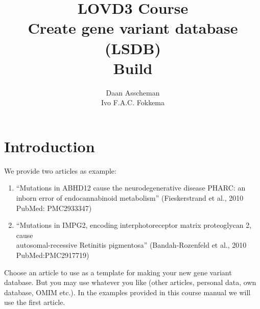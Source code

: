 

\title{LOVD3 Course \\\vskip 0.2cm Create gene variant database (LSDB) \\\vskip 0.2cm Build \LOVDversion}
\author{Daan Asscheman \\ Ivo F.A.C. Fokkema}
\setpointerwidth{9pt}





\begin{titlingpage} %
\maketitle
\end{titlingpage}





\hypertarget{toc}{}
\tableofcontents









\chapter{Introduction}
We provide two articles as example:
\begin{enumerate}
	\item 
	``Mutations in ABHD12 cause the neurodegenerative disease PHARC: an inborn error of endocannabinoid
	 metabolism'' (Fieskerstrand et al., 2010 PubMed: PMC2933347)
	\item
	``Mutations in IMPG2, encoding interphotoreceptor matrix proteoglycan 2, cause \\
		autosomal-recessive Retinitis pigmentosa'' (Bandah-Rozenfeld et al., 2010 \\
		PubMed:PMC2917719)
\end{enumerate}
Choose an article to use as a template for making your new gene variant database. 
But you may use whatever you like (other articles, personal data, own database, OMIM etc.).
In the examples provided in this course manual we will use the first article.


